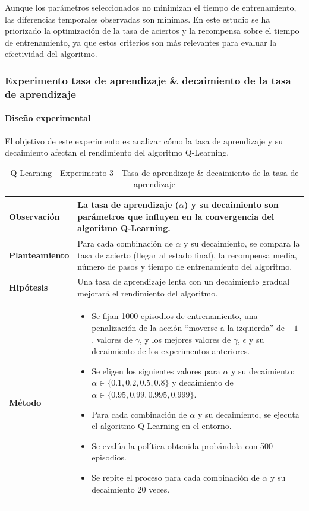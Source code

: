 Aunque los parámetros seleccionados no minimizan el tiempo de entrenamiento, las diferencias temporales observadas son mínimas. En este estudio se ha priorizado la optimización de la tasa de aciertos y la recompensa sobre el tiempo de entrenamiento, ya que estos criterios son más relevantes para evaluar la efectividad del algoritmo.

\subsubsection{Experimento tasa de aprendizaje \& decaimiento de la tasa de aprendizaje}

\paragraph{Diseño experimental}
El objetivo de este experimento es analizar cómo la tasa de aprendizaje y su decaimiento afectan el rendimiento del algoritmo Q-Learning.

\begin{table}[H]
    \centering
    \begin{tabularx}{\textwidth}{|p{4cm}|X|} %
        \hline %
        \textbf{Observación} & La tasa de aprendizaje ($\alpha$) y su decaimiento son parámetros que influyen en la convergencia del algoritmo Q-Learning.
        \\ \hline 
        \textbf{Planteamiento} & Para cada combinación de $\alpha$ y su decaimiento, se compara la tasa de acierto (llegar al estado final), la recompensa media, número de pasos y tiempo de entrenamiento del algoritmo.
        \\ \hline 
        \textbf{Hipótesis} & Una tasa de aprendizaje lenta con un decaimiento gradual mejorará el rendimiento del algoritmo.
        \\ \hline 
        \textbf{Método} & 
        \begin{itemize}
            \item Se fijan 1000 episodios de entrenamiento, una penalización de la acción ``moverse a la izquierda'' de $-1$. valores de \(\gamma\), y los mejores valores de \(\gamma\), \(\epsilon\) y su decaimiento de los experimentos anteriores.
            \item Se eligen los siguientes valores para $\alpha$ y su decaimiento: $\alpha \in \{0.1, 0.2, 0.5, 0.8\}$ y decaimiento de $\alpha \in \{0.95, 0.99, 0.995, 0.999\}$.
            \item Para cada combinación de $\alpha$ y su decaimiento, se ejecuta el algoritmo Q-Learning en el entorno.
            \item Se evalúa la política obtenida probándola con 500 episodios.
            \item Se repite el proceso para cada combinación de $\alpha$ y su decaimiento 20 veces.
        \end{itemize}
        \\ \hline
    \end{tabularx}
    \caption{Q-Learning - Experimento 3 - Tasa de aprendizaje \& decaimiento de la tasa de aprendizaje}
    \label{tab:diseñoQLEarningExp3}
\end{table}


